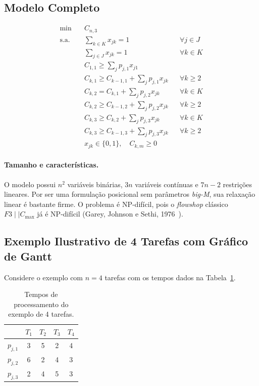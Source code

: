 \documentclass[11pt,a4paper]{article}
\begin{document}
\subsection{Modelo Completo}
\begin{align*}
    \min\quad & C_{n,3}\\
    \text{s.a.}\quad
    & \sum_{k\in K} x_{jk} = 1 && \forall j \in J\\
    & \sum_{j\in J} x_{jk} = 1 && \forall k \in K\\
    & C_{1,1} \ge \sum_{j} p_{j,1}x_{j1}\\
    & C_{k,1} \ge C_{k-1,1} + \sum_{j} p_{j,1}x_{jk} && \forall k \ge 2\\
    & C_{k,2} = C_{k,1} + \sum_{j} p_{j,2}x_{jk} && \forall k \in K\\
    & C_{k,2} \ge C_{k-1,2} + \sum_{j} p_{j,2}x_{jk} && \forall k \ge 2\\
    & C_{k,3} \ge C_{k,2} + \sum_{j} p_{j,3}x_{jk} && \forall k \in K\\
    & C_{k,3} \ge C_{k-1,3} + \sum_{j} p_{j,3}x_{jk} && \forall k \ge 2\\
    & x_{jk} \in \{0,1\},\quad C_{k,m} \ge 0
\end{align*}

\paragraph{Tamanho e características.} O modelo possui $n^2$ variáveis binárias, $3n$ variáveis contínuas e $7n - 2$ restrições lineares. Por ser uma formulação posicional sem parâmetros \textit{big-M}, sua relaxação linear é bastante firme. O problema é NP-difícil, pois o \textit{flowshop} clássico $F3 \mid\mid C_{\max}$ já é NP-difícil (Garey, Johnson e Sethi, 1976~\cite{garey1976}).

\subsection{Exemplo Ilustrativo de 4 Tarefas com Gráfico de Gantt}
Considere o exemplo com $n = 4$ tarefas com os tempos dados na Tabela~\ref{tab:ex4}.

\begin{table}[H]
\centering
\caption{Tempos de processamento do exemplo de 4 tarefas.}
\label{tab:ex4}
\begin{tabular}{@{}ccccc@{}}
\toprule
 & $T_1$ & $T_2$ & $T_3$ & $T_4$ \\ \midrule
$p_{j,1}$ & 3 & 5 & 2 & 4 \\
$p_{j,2}$ & 6 & 2 & 4 & 3 \\
$p_{j,3}$ & 2 & 4 & 5 & 3 \\ \bottomrule
\end{tabular}
\end{table}
\end{document}
